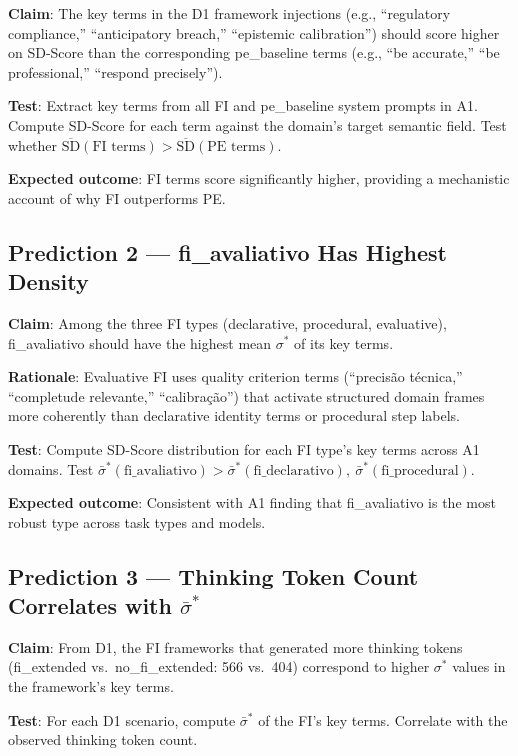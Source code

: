 \documentclass[11pt,a4paper]{article}
\begin{document}
\textbf{Claim}: The key terms in the D1 framework injections
(e.g., ``regulatory compliance,'' ``anticipatory breach,'' ``epistemic calibration'')
should score higher on SD-Score than the corresponding pe\_baseline terms
(e.g., ``be accurate,'' ``be professional,'' ``respond precisely'').

\textbf{Test}: Extract key terms from all FI and pe\_baseline system prompts
in A1. Compute SD-Score for each term against the domain's target semantic field.
Test whether $\overline{\text{SD}}(\text{FI terms}) > \overline{\text{SD}}(\text{PE terms})$.

\textbf{Expected outcome}: FI terms score significantly higher,
providing a mechanistic account of why FI outperforms PE.

\subsection{Prediction 2 — fi\_avaliativo Has Highest Density}

\textbf{Claim}: Among the three FI types (declarative, procedural, evaluative),
fi\_avaliativo should have the highest mean $\sigma^*$ of its key terms.

\textbf{Rationale}: Evaluative FI uses quality criterion terms
(``precisão técnica,'' ``completude relevante,'' ``calibração'') that activate
structured domain frames more coherently than declarative identity terms
or procedural step labels.

\textbf{Test}: Compute SD-Score distribution for each FI type's key terms
across A1 domains. Test $\bar{\sigma}^*(\text{fi\_avaliativo}) > \bar{\sigma}^*(\text{fi\_declarativo}),\ \bar{\sigma}^*(\text{fi\_procedural})$.

\textbf{Expected outcome}: Consistent with A1 finding that fi\_avaliativo
is the most robust type across task types and models.

\subsection{Prediction 3 — Thinking Token Count Correlates with $\bar{\sigma}^*$}

\textbf{Claim}: From D1, the FI frameworks that generated more thinking tokens
(fi\_extended vs.\ no\_fi\_extended: 566 vs.\ 404) correspond to higher $\sigma^*$
values in the framework's key terms.

\textbf{Test}: For each D1 scenario, compute $\bar{\sigma}^*$ of the FI's key terms.
Correlate with the observed thinking token count.
\end{document}
